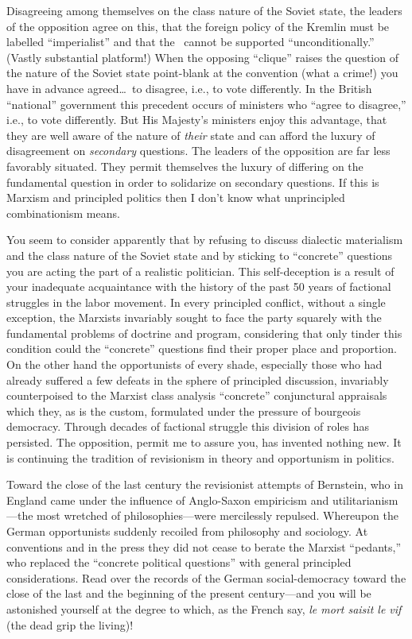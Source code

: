 Disagreeing among themselves on the class nature of the Soviet state, the leaders of the opposition agree on this, that the foreign policy of the Kremlin must be labelled “imperialist” and that the \USSR\ cannot be supported “unconditionally.” (Vastly substantial platform!) When the opposing “clique” raises the question of the nature of the Soviet state point-blank at the convention (what a crime!) you have in advance agreed\dots\ to disagree, i.e., to vote differently. In the British “national” government this precedent occurs of ministers who “agree to disagree,” i.e., to vote differently. But His Majesty’s ministers enjoy this advantage, that they are well aware of the nature of \emph{their} state and can afford the luxury of disagreement on \emph{secondary} questions. The leaders of the opposition are far less favorably situated. They permit themselves the luxury of differing on the fundamental question in order to solidarize on secondary questions. If this is Marxism and principled politics then I don’t know what unprincipled combinationism means.

You seem to consider apparently that by refusing to discuss dialectic materialism and the class nature of the Soviet state and by sticking to “concrete” questions you are acting the part of a realistic politician. This self-deception is a result of your inadequate acquaintance with the history of the past 50 years of factional struggles in the labor movement. In every principled conflict, without a single exception, the Marxists invariably sought to face the party squarely with the fundamental problems of doctrine and program, considering that only tinder this condition could the “concrete” questions find their proper place and proportion. On the other hand the opportunists of every shade, especially those who had already suffered a few defeats in the sphere of principled discussion, invariably counterpoised to the Marxist class analysis “concrete” conjunctural appraisals which they, as is the custom, formulated under the pressure of bourgeois democracy. Through decades of factional struggle this division of roles has persisted. The opposition, permit me to assure you, has invented nothing new. It is continuing the tradition of revisionism in theory and opportunism in politics.

\noclub
\enlargethispage{-1 \baselineskip}
Toward the close of the last century the revisionist attempts of Bernstein, who in England came under the influence of Anglo-Saxon empiricism and utilitarianism---the most wretched of philosophies---were mercilessly repulsed. Whereupon the German opportunists suddenly recoiled from philosophy and sociology. At conventions and in the press they did not cease to berate the Marxist “pedants,” who replaced the “concrete political questions” with general principled considerations. Read over the records of the German social-democracy toward the close of the last and the beginning of the present century---and you will be astonished yourself at the degree to which, as the French say, \emph{le mort saisit le vif} (the dead grip the living)!

